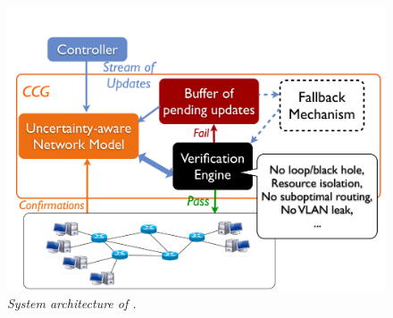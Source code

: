 \begin{figure}[!ht]
  \centering
  \includegraphics[scale=0.2,trim=0 0 0 1cm]{figs/structure_new}
  \vspace{-0.1in}
  \caption{\em \small System architecture of \name.}
  \vspace{-0.2in}
  \label{fig:structure}
\end{figure}



